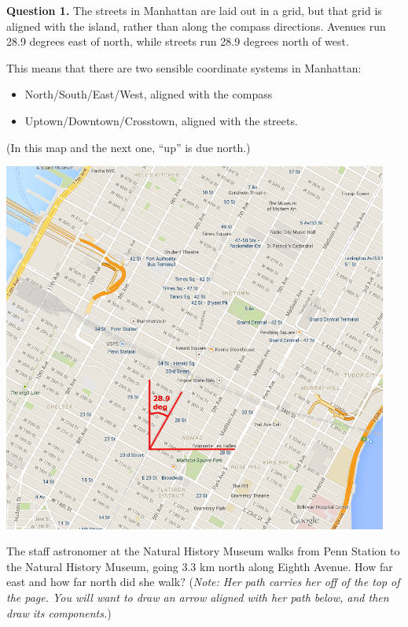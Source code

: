 \documentclass[12pt]{article}
\newcommand{\BI}{\begin{itemize}}
\newcommand{\EI}{\end{itemize}}
\def\BS{\bigskip}
\begin{document}
\newpage
\begin{minipage}{0.4\textwidth}
{\bf Question 1.} The streets in Manhattan are laid out in a grid, but that grid is aligned with the island, rather than along the compass directions. Avenues run 28.9 degrees east of north, while streets run 28.9 degrees north of west. 

\BS

This means that there are two sensible coordinate systems in Manhattan:


\BI
\item North/South/East/West, aligned with the compass
\item Uptown/Downtown/Crosstown, aligned with the streets.
\EI
	(In this map and the next one, “up” is due north.)

\end{minipage}
\begin{minipage}{0.6\textwidth}
	\begin{center}
	
	
	\includegraphics[width=0.95\textwidth]{manhattan-1.png}
	

\end{center}
\end{minipage}
\BS\BS

The staff astronomer at the Natural History Museum walks from Penn Station to the Natural History Museum, going 3.3 km north along Eighth Avenue. How far east and how far north did she walk? ({\it Note: Her path carries her off of the top of the page. You will want to draw an arrow aligned with her path below, and then draw its components.})
\end{document}
